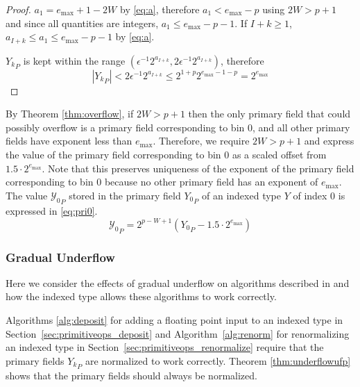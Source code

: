       \begin{proof}
        $a_1 = e_{\max} + 1 - 2 W$ by \eqref{eq:a}, therefore $a_1 < e_{\max} - p$ using $2W > p+1$ and since all quantities are integers, $a_1 \leq e_{\max} - p - 1$. If $I + k \geq 1$, $a_{I + k} \leq a_1 \leq e_{\max} - p - 1$ by \eqref{eq:a}.

        ${Y_k}_P$ is kept within the range $(\epsilon^{-1} 2^{a_{I + k}}, 2 \epsilon^{-1} 2^{a_{I + k}})$, therefore
        \begin{equation*}
          |{Y_k}_P| < 2 \epsilon^{-1} 2^{a_{I + k}} \leq 2^{1 + p} 2^{e_{\max} - 1 - p} = 2^{e_{\max}}
        \end{equation*}
      \end{proof}
      By Theorem \ref{thm:overflow}, if $2 W > p + 1$ then the only primary
      field that could possibly overflow is a primary field corresponding to
      bin 0, and all other primary fields have exponent less than $e_{\max}$.
      Therefore, we require $2 W > p + 1$ and express the value of the primary
      field corresponding to bin 0 as a scaled offset from
      $1.5\cdot2^{e_{\max}}$. Note that this preserves uniqueness of the
      exponent of the primary field corresponding to bin 0 because no other
      primary field has an exponent of $e_{\max}$. The value
      ${\mathcal{Y}_0}_P$ stored in the primary field ${Y_0}_P$ of an indexed
      type $Y$ of index 0 is expressed in \eqref{eq:pri0}.
      \begin{equation}
        {\mathcal{Y}_0}_P = 2^{p - W + 1}({Y_0}_P - 1.5\cdot2^{e_{\max}})
        \label{eq:pri0}
      \end{equation}
    \subsubsection{Gradual Underflow}
      \label{sec:indexed_underflow_gradual}
      Here we consider the effects of gradual underflow on algorithms described
      in \cite{repsum} and how the indexed type allows these algorithms to work
      correctly.

      Algorithms \ref{alg:deposit} for adding a floating point input to an
      indexed type in Section~\ref{sec:primitiveops_deposit} and
      Algorithm~\ref{alg:renorm} for renormalizing an indexed type in
      Section~\ref{sec:primitiveops_renormalize} require that the primary
      fields ${Y_k}_P$ are normalized to work correctly. Theorem
      \ref{thm:underflowufp} shows that the primary fields should always be
      normalized.


